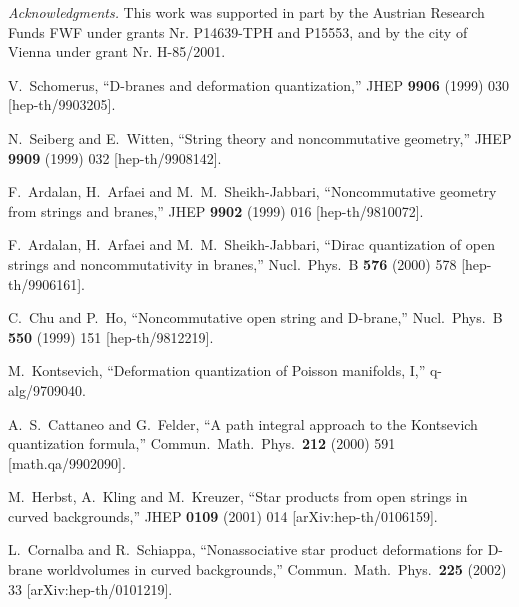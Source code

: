 \documentclass[a4paper,11pt]{article}               \def\new#1\endnew{{\bf #1}}
\begin{document}
\emph{Acknowledgments.} This work was supported in part by the Austrian 
Research Funds FWF under grants Nr. P14639-TPH and P15553,
and by the city of Vienna under grant Nr. H-85/2001.

\newpage

\addtolength{\itemsep}{-7pt}

\vspace{-4truemm}

V.~Schomerus,
``D-branes and deformation quantization,''
JHEP {\bf 9906} (1999) 030
[hep-th/9903205].

N.~Seiberg and E.~Witten,
``String theory and noncommutative geometry,''
JHEP {\bf 9909} (1999) 032
[hep-th/9908142].

F.~Ardalan, H.~Arfaei and M.~M.~Sheikh-Jabbari,
``Noncommutative geometry from strings and branes,''
JHEP {\bf 9902} (1999) 016
[hep-th/9810072].

F.~Ardalan, H.~Arfaei and M.~M.~Sheikh-Jabbari,
``Dirac quantization of open strings and noncommutativity in branes,''
Nucl.\ Phys.\ B {\bf 576} (2000) 578
[hep-th/9906161].

C.~Chu and P.~Ho,
``Noncommutative open string and D-brane,''
Nucl.\ Phys.\ B {\bf 550} (1999) 151
[hep-th/9812219].

M.~Kontsevich,
``Deformation quantization of Poisson manifolds, I,''
q-alg/9709040.

A.~S.~Cattaneo and G.~Felder,
``A path integral approach to the Kontsevich quantization formula,''
Commun.\ Math.\ Phys.\  {\bf 212} (2000) 591
[math.qa/9902090].

M.~Herbst, A.~Kling and M.~Kreuzer,
``Star products from open strings in curved backgrounds,''
JHEP {\bf 0109} (2001) 014
[arXiv:hep-th/0106159].

L.~Cornalba and R.~Schiappa,
``Nonassociative star product deformations for D-brane worldvolumes in curved 
backgrounds,''
Commun.\ Math.\ Phys.\  {\bf 225} (2002) 33
[arXiv:hep-th/0101219].
\end{document}
